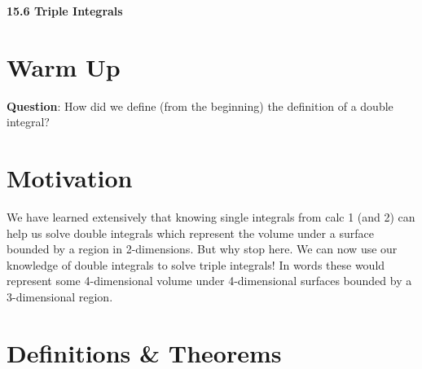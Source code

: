 \documentclass[11pt]{article}
\newcommand{\vs}{\vspace*{.1in}}
\begin{document}
\begin{LARGE}\begin{center}\bf 15.6 Triple Integrals\end{center}
\end{LARGE}

\vs\vs



\section{Warm Up}
\textbf{Question}: How did we define (from the beginning) the definition of a double integral?


\section{Motivation}
We have learned extensively that knowing single integrals from calc 1 (and 2) can help us solve double integrals which represent the volume under a surface bounded by a region in 2-dimensions. But why stop here. We can now use our knowledge of double integrals to solve triple integrals! In words these would represent some 4-dimensional volume under 4-dimensional surfaces bounded by a 3-dimensional region.


\section{Definitions \& Theorems}
\end{document}
